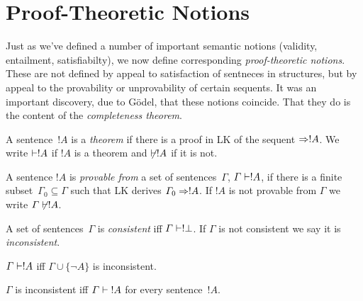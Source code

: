 \documentclass[open-logic-section]{subfiles}
\begin{document}
\section{Proof-Theoretic Notions}

\begin{wordy}
Just as we've defined a number of important semantic notions
(validity, entailment, satisfiabilty), we now define corresponding
\emph{proof-theoretic notions}. These are not defined by appeal to
satisfaction of sentneces in structures, but by appeal to the
provability or unprovability of certain sequents.  It was an important
discovery, due to G\"odel, that these notions coincide.  That they do
is the content of the \emph{completeness theorem}.
\end{wordy}

\begin{defn}[Theorems]
A sentence~$!A$ is a \emph{theorem} if there is a proof in LK of the
sequent $\Rightarrow !A$. We write $\Proves !A$ if $!A$ is a theorem and
$\Proves/ !A$ if it is not.
\end{defn}

\begin{defn}[Provability]
A sentence $!A$ is \emph{provable from} a set of sentences~$\Gamma$,
$\Gamma \Proves !A$, if there is a finite subset~$\Gamma_0 \subseteq
\Gamma$ such that LK derives $\Gamma_0 \Rightarrow !A$.  If $!A$ is not
provable from $\Gamma$ we write $\Gamma \Proves/ !A$.
\end{defn}

\begin{defn}[Consistency]
A set of sentences~$\Gamma$ is \emph{consistent} iff $\Gamma \Proves!
\lfalse$.  If $\Gamma$ is not consistent we say it is \emph{inconsistent}.
\end{defn}

\begin{prop}
$\Gamma \Proves !A$ iff $\Gamma \cup \{\lnot A\}$ is inconsistent.
\end{prop}

\begin{prop}
$\Gamma$ is inconsistent iff $\Gamma \Proves {!A}$ for every sentence~$!A$.
\end{prop}
\end{document}

